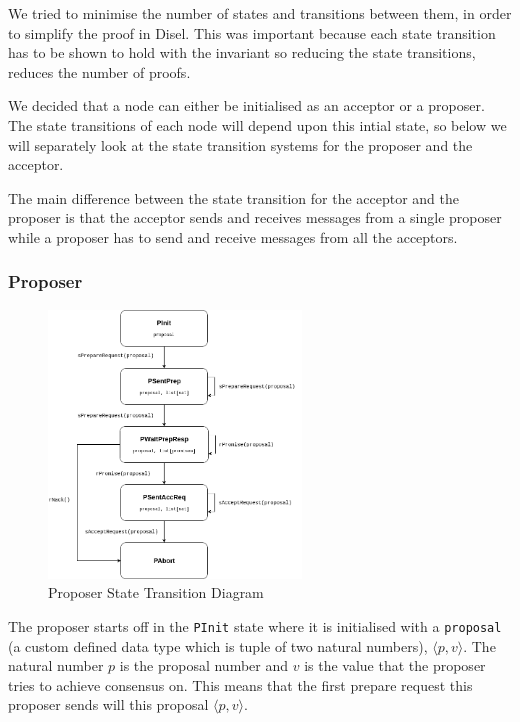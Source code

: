 We tried to minimise the number of states and transitions between them, in order
to simplify the proof in Disel. This was important because each state transition
has to be shown to hold with the invariant so reducing the state transitions,
reduces the number of proofs.

We decided that a node can either be initialised as an acceptor or a proposer.
The state transitions of each node will depend upon this intial state, so below
we will separately look at the state transition systems for the proposer and the
acceptor.

The main difference between the state transition for the acceptor and the proposer
is that the acceptor sends and receives messages from a single proposer while a
proposer has to send and receive messages from all the acceptors.


\subsubsection{Proposer}
\begin{figure}
\centering
\includegraphics[width=0.6\textwidth]{figures/proposer_state_transitions.png}
\caption{Proposer State Transition Diagram
\label{fig:myInlineFigure}}
\end{figure}

The proposer starts off in the \texttt{PInit} state where it is initialised with
a \texttt{proposal} (a custom defined data type which is tuple of two natural numbers),
$\langle p, v \rangle$.
The natural number $p$ is the proposal number and $v$ is the value that the
proposer tries to achieve consensus on. This means that the first prepare
request this proposer sends will this proposal $\langle p, v \rangle$.

